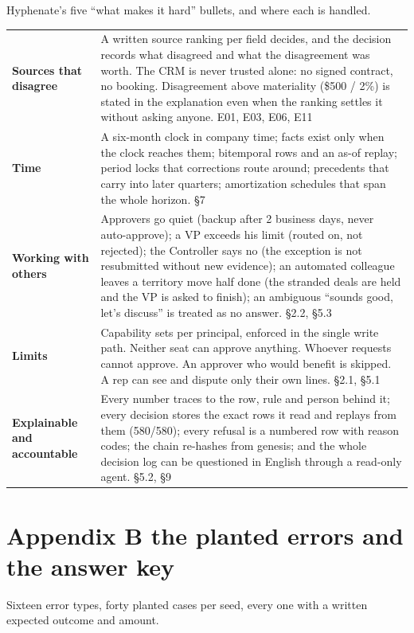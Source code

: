 \documentclass[10pt,a4paper]{article}
\newcommand{\gy}[1]{{\color{qgrey}#1}}
\newcommand{\lead}[1]{{\color{qgrey}\small #1}}
\begin{document}
\lead{Hyphenate's five ``what makes it hard'' bullets, and where each is handled.}

\renewcommand{\arraystretch}{1.25}
\begin{tabularx}{\textwidth}{@{}p{38mm}X@{}}
\toprule
\textbf{Sources that disagree} & A written source ranking per field decides, and the decision records what disagreed and what the disagreement was worth. The CRM is never trusted alone: no signed contract, no booking. Disagreement above materiality \gy{(\$500 / 2\%)} is stated in the explanation even when the ranking settles it without asking anyone. \gy{E01, E03, E06, E11}\\
\textbf{Time} & A six-month clock in company time; facts exist only when the clock reaches them; bitemporal rows and an as-of replay; period locks that corrections route around; precedents that carry into later quarters; amortization schedules that span the whole horizon. \gy{\S7}\\
\textbf{Working with others} & Approvers go quiet \gy{(backup after 2 business days, never auto-approve)}; a VP exceeds his limit \gy{(routed on, not rejected)}; the Controller says no \gy{(the exception is not resubmitted without new evidence)}; an automated colleague leaves a territory move half done \gy{(the stranded deals are held and the VP is asked to finish)}; an ambiguous ``sounds good, let's discuss'' is treated as no answer. \gy{\S2.2, \S5.3}\\
\textbf{Limits} & Capability sets per principal, enforced in the single write path. Neither seat can approve anything. Whoever requests cannot approve. An approver who would benefit is skipped. A rep can see and dispute only their own lines. \gy{\S2.1, \S5.1}\\
\textbf{Explainable and accountable} & Every number traces to the row, rule and person behind it; every decision stores the exact rows it read and replays from them \gy{(580/580)}; every refusal is a numbered row with reason codes; the chain re-hashes from genesis; and the whole decision log can be questioned in English through a read-only agent. \gy{\S5.2, \S9}\\
\bottomrule
\end{tabularx}

\section*{\color{qink}Appendix B \textemdash{} the planted errors and the answer key}

\lead{Sixteen error types, forty planted cases per seed, every one with a written expected outcome and amount.}
\end{document}
